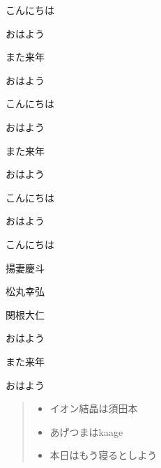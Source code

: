 \documentclass[book, twoside, paper=b5j, fleqn, jafontsize=9pt, jafontscale=0.91, head_space=22mm, foot_space=9mm, fore-edge=16mm, gutter=25mm, hanging_punctuation]{jlreq}
\begin{document}
\begin{enumerate-brackets}
    \item こんにちは
    \item おはよう
    \item また来年
    \item おはよう
\end{enumerate-brackets}
\begin{enumerate-circle}
    \item こんにちは
    \item おはよう
    \item また来年
    \item おはよう
\end{enumerate-circle}
\begin{enumerate-square}
    \item こんにちは
    \begin{enumerate-alphabet}
        \item おはよう
        \item こんにちは
        \item 揚妻慶斗
        \item 松丸幸弘
        \item 関根大仁
    \end{enumerate-alphabet}
    \item おはよう
    \item また来年
    \item おはよう
\end{enumerate-square}
\begin{quote}
\begin{itemize}
    \item イオン結晶は須田本
    \item あげつまはkaage
    \item 本日はもう寝るとしよう
\end{itemize}
\end{quote}
\end{document}
